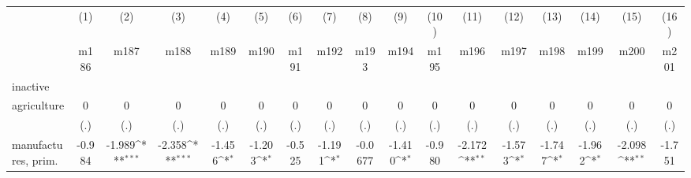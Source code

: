 {
\def\sym#1{\ifmmode^{#1}\else\(^{#1}\)\fi}
\begin{tabular}{l*{16}{c}}
\hline\hline
                    &\multicolumn{1}{c}{(1)}&\multicolumn{1}{c}{(2)}&\multicolumn{1}{c}{(3)}&\multicolumn{1}{c}{(4)}&\multicolumn{1}{c}{(5)}&\multicolumn{1}{c}{(6)}&\multicolumn{1}{c}{(7)}&\multicolumn{1}{c}{(8)}&\multicolumn{1}{c}{(9)}&\multicolumn{1}{c}{(10)}&\multicolumn{1}{c}{(11)}&\multicolumn{1}{c}{(12)}&\multicolumn{1}{c}{(13)}&\multicolumn{1}{c}{(14)}&\multicolumn{1}{c}{(15)}&\multicolumn{1}{c}{(16)}\\
                    &\multicolumn{1}{c}{m186}&\multicolumn{1}{c}{m187}&\multicolumn{1}{c}{m188}&\multicolumn{1}{c}{m189}&\multicolumn{1}{c}{m190}&\multicolumn{1}{c}{m191}&\multicolumn{1}{c}{m192}&\multicolumn{1}{c}{m193}&\multicolumn{1}{c}{m194}&\multicolumn{1}{c}{m195}&\multicolumn{1}{c}{m196}&\multicolumn{1}{c}{m197}&\multicolumn{1}{c}{m198}&\multicolumn{1}{c}{m199}&\multicolumn{1}{c}{m200}&\multicolumn{1}{c}{m201}\\
\hline
inactive            &                     &                     &                     &                     &                     &                     &                     &                     &                     &                     &                     &                     &                     &                     &                     &                     \\
agriculture         &           0         &           0         &           0         &           0         &           0         &           0         &           0         &           0         &           0         &           0         &           0         &           0         &           0         &           0         &           0         &           0         \\
                    &         (.)         &         (.)         &         (.)         &         (.)         &         (.)         &         (.)         &         (.)         &         (.)         &         (.)         &         (.)         &         (.)         &         (.)         &         (.)         &         (.)         &         (.)         &         (.)         \\
[1em]
manufactures, prim. &      -0.984         &      -1.989\sym{***}&      -2.358\sym{***}&      -1.456\sym{*}  &      -1.203\sym{*}  &      -0.525         &      -1.191\sym{*}  &     -0.0677         &      -1.410\sym{*}  &      -0.980         &      -2.172\sym{**} &      -1.573\sym{*}  &      -1.747\sym{*}  &      -1.962\sym{*}  &      -2.098\sym{**} &      -1.751         \\

\end{tabular}}
